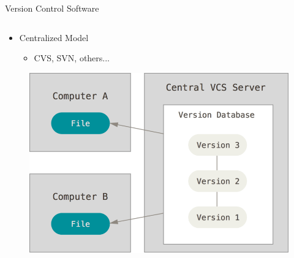 \documentclass[11pt,professionalfonts]{beamer}
\begin{document}
\begin{frame}{Version Control Software}%
\begin{columns}
\begin{column}[t]{0.5\textwidth}
\begin{itemize}
    \item Centralized Model
    \begin{itemize}
        \item CVS, SVN, others...
    \end{itemize}
\end{itemize}

\begin{figure}
    \centering
    \includegraphics[width=\columnwidth]{figures/centralized.png}        
\end{figure}
\end{column}


\end{columns}
\end{frame}
\end{document}
